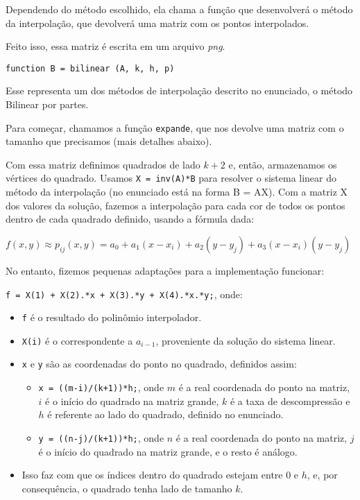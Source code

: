 \documentclass[12pt,letterpaper]{article}
\begin{document}
    Dependendo do método escolhido, ela chama a função que desenvolverá o método da interpolação, que devolverá uma matriz com os pontos interpolados.

    Feito isso, essa matriz é escrita em um arquivo \textit{png}.

    \begin{center}
        \texttt{function B = bilinear (A, k, h, p)}
    \end{center}

    Esse representa um dos métodos de interpolação descrito no enunciado, o método Bilinear por partes.

    Para começar, chamamos a função \texttt{expande}, que nos devolve uma matriz com o tamanho que precisamos (mais detalhes abaixo).

    Com essa matriz definimos quadrados de lado $k+2$ e, então, armazenamos os vértices do quadrado. Usamos \texttt{X = inv(A)*B} para resolver o sistema linear do método da interpolação (no enunciado está na forma B = AX). Com a matriz X dos valores da solução, fazemos a interpolação para cada cor de todos os pontos dentro de cada quadrado definido, usando a fórmula dada:

    \begin{center}
        $f(x, y) \approx p_{ij} (x, y) = a_0 + a_1(x - x_i ) + a_2 (y - y_j ) + a_3 (x - x_i )(y - y_j)$
    \end{center}

    No entanto, fizemos pequenas adaptações para a implementação funcionar:

    \begin{center}
        \texttt{f = X(1) + X(2).*x + X(3).*y + X(4).*x.*y;}, onde:
    \end{center}

    \begin{itemize}
        \item \texttt{f} é o resultado do polinômio interpolador.
        \item \texttt{X(i)} é o correspondente a $a_{i-1}$, proveniente da solução do sistema linear.
        \item \texttt{x} e \texttt{y} são as coordenadas do ponto no quadrado, definidos assim:
        \begin{itemize}
            \item \texttt{x = ((m-i)/(k+1))*h;}, onde $m$ é a real coordenada do ponto na matriz, $i$ é o início do quadrado na matriz grande, $k$ é a taxa de descompressão e $h$ é referente ao lado do quadrado, definido no enunciado.
            \item \texttt{y = ((n-j)/(k+1))*h;}, onde $n$ é a real coordenada do ponto na matriz, $j$ é o início do quadrado na matriz grande, e o resto é análogo.
        \end{itemize}
        \item Isso faz com que os índices dentro do quadrado estejam entre 0 e $h$, e, por consequência, o quadrado tenha lado de tamanho $k$.
    \end{itemize}
\end{document}
